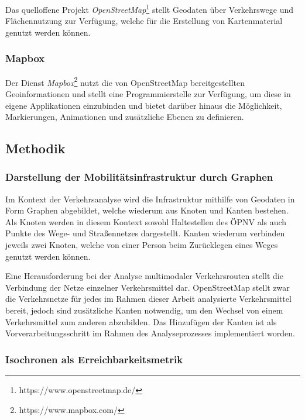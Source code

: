 Das quelloffene Projekt \emph{OpenStreetMap}\footnote{https://www.openstreetmap.de/} stellt Geodaten über Verkehrswege und Flächennutzung zur Verfügung, welche für die Erstellung von Kartenmaterial genutzt werden können.

\subsubsection{Mapbox}
\label{mapbox}

Der Dienst \emph{Mapbox}\footnote{https://www.mapbox.com/} nutzt die von OpenStreetMap bereitgestellten Geoinformationen und stellt eine Programmierstelle zur Verfügung, um diese in eigene Applikationen einzubinden und bietet darüber hinaus die Möglichkeit, Markierungen, Animationen und zusätzliche Ebenen zu definieren.

\subsection{Methodik}
\label{methodik}

\subsubsection{Darstellung der Mobilitätsinfrastruktur durch Graphen}
\label{darstellung_der_mobiltaetsinfrastruktur_durch_graphen}

Im Kontext der Verkehrsanalyse wird die Infrastruktur mithilfe von Geodaten in Form Graphen abgebildet, welche wiederum aus Knoten und Kanten bestehen. Als Knoten werden in diesem Kontext sowohl Haltestellen des \ac{ÖPNV} als auch Punkte des Wege- und Straßennetzes dargestellt. Kanten wiederum verbinden jeweils zwei Knoten, welche von einer Person beim Zurücklegen eines Weges genutzt werden können.

Eine Herausforderung bei der Analyse multimodaler Verkehrsrouten stellt die Verbindung der Netze einzelner Verkehrsmittel dar. OpenStreetMap stellt zwar die Verkehrsnetze für jedes im Rahmen dieser Arbeit analysierte Verkehrsmittel bereit, jedoch sind zusätzliche Kanten notwendig, um den Wechsel von einem Verkehrsmittel zum anderen abzubilden. Das Hinzufügen der Kanten ist als Vorverarbeitungsschritt im Rahmen des Analyseprozesses implementiert worden.

\subsubsection{Isochronen als Erreichbarkeitsmetrik}
\label{isochronen_als_vergleichbarkeitsmetrik}

